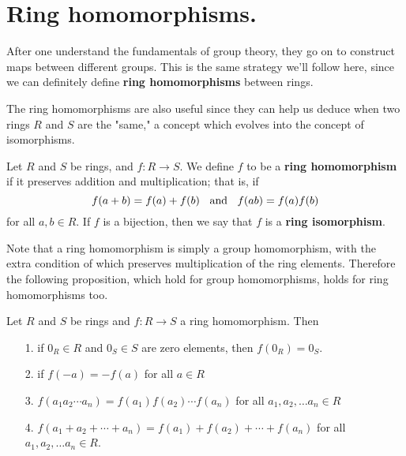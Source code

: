     \newpage
    \section{Ring homomorphisms.}
    After one understand the fundamentals of group theory, they go
    on to construct maps between different groups. This is the
    same strategy we'll follow here, since we can definitely
    define \textbf{ring homomorphisms} between rings.

    The ring homomorphisms are also useful since they can help us
    deduce when two rings $R$ and $S$ are the "same," a concept
    which evolves into the concept of isomorphisms.

    \begin{definition}
        Let $R$ and $S$ be rings, and $f:R \to S$. We define $f$
        to be a \textbf{ring homomorphism} if it preserves
        addition and multiplication; that is, if
        \[
            f(a + b) = f(a) + f(b) \hspace{0.2cm}\text{ and }\hspace{0.2cm} 
            f(ab) = f(a)f(b) 
        \]
        for all $a, b \in R$. If $f$ is a bijection, then we say
        that $f$ is a \textbf{ring isomorphism}.
    \end{definition}

    \textcolor{NavyBlue}{Note that a ring homomorphism is simply a
    group homomorphism, with the extra condition of which preserves multiplication of the
    ring elements.} Therefore the following proposition, which
    hold for group homomorphisms, holds for ring homomorphisms
    too. 
    \begin{proposition}
        Let $R$ and $S$ be rings and $f: R \to S$ a ring homomorphism.
        Then 
        \begin{itemize}
            \item[1.] if $0_R \in R$ and $0_S \in S$ are zero
            elements, then $f(0_R) = 0_S$. 

            \item[2.] if $f(-a) = -f(a)$ for all $a \in R$
            \item[3.] $f(a_1a_2\cdots a_n) = f(a_1)f(a_2)\cdots
            f(a_n)$ for all $a_1, a_2, \dots a_n \in R$
            \item[4.] $f(a_1 + a_2 + \cdots + a_n) = f(a_1) +
            f(a_2) + \cdots + f(a_n)$ for all $a_1, a_2, \dots a_n \in R$.
        \end{itemize} 
    \end{proposition}
    
